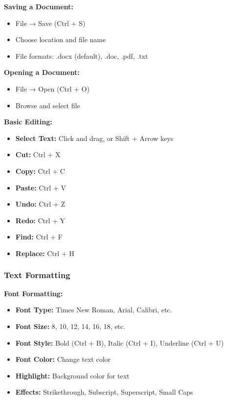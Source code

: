 \documentclass[12pt,a4paper]{article}
\begin{document}
\textbf{Saving a Document:}
\begin{itemize}
    \item File → Save (Ctrl + S)
    \item Choose location and file name
    \item File formats: .docx (default), .doc, .pdf, .txt
\end{itemize}

\textbf{Opening a Document:}
\begin{itemize}
    \item File → Open (Ctrl + O)
    \item Browse and select file
\end{itemize}

\textbf{Basic Editing:}
\begin{itemize}
    \item \textbf{Select Text:} Click and drag, or Shift + Arrow keys
    \item \textbf{Cut:} Ctrl + X
    \item \textbf{Copy:} Ctrl + C
    \item \textbf{Paste:} Ctrl + V
    \item \textbf{Undo:} Ctrl + Z
    \item \textbf{Redo:} Ctrl + Y
    \item \textbf{Find:} Ctrl + F
    \item \textbf{Replace:} Ctrl + H
\end{itemize}

\subsubsection{Text Formatting}

\textbf{Font Formatting:}
\begin{itemize}
    \item \textbf{Font Type:} Times New Roman, Arial, Calibri, etc.
    \item \textbf{Font Size:} 8, 10, 12, 14, 16, 18, etc.
    \item \textbf{Font Style:} Bold (Ctrl + B), Italic (Ctrl + I), Underline (Ctrl + U)
    \item \textbf{Font Color:} Change text color
    \item \textbf{Highlight:} Background color for text
    \item \textbf{Effects:} Strikethrough, Subscript, Superscript, Small Caps
\end{itemize}
\end{document}
